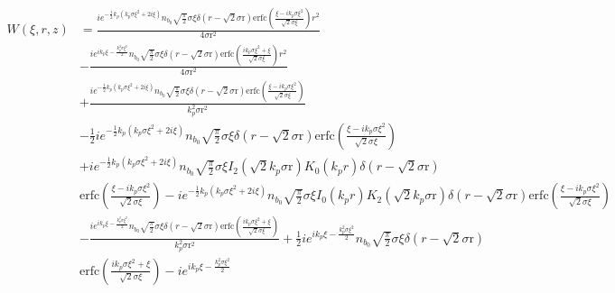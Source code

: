 \newpage
\begin{equation}
\label{WApprox}
\begin{split}
W\left(\xi,r,z\right)&=\frac{i e^{-\frac{1}{2} k_p\left(k_p\sigma \xi ^2+2 i \xi \right)}n_{b_0} \sqrt{\frac{\pi }{2}} \sigma \xi  \delta
   \left(r-\sqrt{2} \text{$\sigma $r}\right) \text{erfc}\left(\frac{\xi -i k_p\sigma \xi ^2}{\sqrt{2} \sigma \xi }\right) r^2}{4
   \text{$\sigma $r}^2}\\
   &-\frac{i e^{i k_p\xi -\frac{k_p^2 \sigma \xi ^2}{2}}n_{b_0} \sqrt{\frac{\pi }{2}} \sigma \xi  \delta
   \left(r-\sqrt{2} \text{$\sigma $r}\right) \text{erfc}\left(\frac{i k_p\sigma \xi ^2+\xi }{\sqrt{2} \sigma \xi }\right) r^2}{4
   \text{$\sigma $r}^2}\\
   &+\frac{i e^{-\frac{1}{2} k_p\left(k_p\sigma \xi ^2+2 i \xi \right)}n_{b_0} \sqrt{\frac{\pi }{2}} \sigma \xi
    \delta \left(r-\sqrt{2} \text{$\sigma $r}\right) \text{erfc}\left(\frac{\xi -i k_p\sigma \xi ^2}{\sqrt{2} \sigma \xi
   }\right)}{k_p^2 \text{$\sigma $r}^2}\\
   &-\frac{1}{2} i e^{-\frac{1}{2} k_p\left(k_p\sigma \xi ^2+2 i \xi \right)}n_{b_0}
   \sqrt{\frac{\pi }{2}} \sigma \xi  \delta \left(r-\sqrt{2} \text{$\sigma $r}\right) \text{erfc}\left(\frac{\xi -i k_p\sigma \xi
   ^2}{\sqrt{2} \sigma \xi }\right)\\
   &+i e^{-\frac{1}{2} k_p\left(k_p\sigma \xi ^2+2 i \xi \right)}n_{b_0} \sqrt{\frac{\pi }{2}}\sigma \xi  I_2\left(\sqrt{2} k_p\text{$\sigma $r}\right) K_0(k_pr) \delta \left(r-\sqrt{2} \text{$\sigma $r}\right)\\
   &\text{erfc}\left(\frac{\xi -i k_p\sigma \xi ^2}{\sqrt{2} \sigma \xi }\right)-i e^{-\frac{1}{2} k_p\left(k_p\sigma \xi ^2+2 i
   \xi \right)}n_{b_0} \sqrt{\frac{\pi }{2}} \sigma \xi  I_0(k_pr) K_2\left(\sqrt{2} k_p\text{$\sigma $r}\right) \delta
   \left(r-\sqrt{2} \text{$\sigma $r}\right) \text{erfc}\left(\frac{\xi -i k_p\sigma \xi ^2}{\sqrt{2} \sigma \xi }\right)\\
   &-\frac{i e^{i
   k_p\xi -\frac{k_p^2 \sigma \xi ^2}{2}}n_{b_0} \sqrt{\frac{\pi }{2}} \sigma \xi  \delta \left(r-\sqrt{2} \text{$\sigma $r}\right)
   \text{erfc}\left(\frac{i k_p\sigma \xi ^2+\xi }{\sqrt{2} \sigma \xi }\right)}{k_p^2 \text{$\sigma $r}^2}+\frac{1}{2} i e^{i
   k_p\xi -\frac{k_p^2 \sigma \xi ^2}{2}}n_{b_0} \sqrt{\frac{\pi }{2}} \sigma \xi  \delta \left(r-\sqrt{2} \text{$\sigma $r}\right)\\
   &\text{erfc}\left(\frac{i k_p\sigma \xi ^2+\xi }{\sqrt{2} \sigma \xi }\right)-i e^{i k_p\xi -\frac{k_p^2 \sigma \xi ^2}{2}}

\end{split}
\end{equation}
